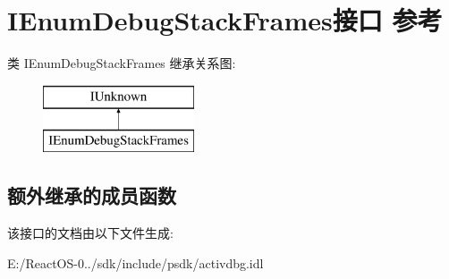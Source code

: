 \hypertarget{interface_i_enum_debug_stack_frames}{}\section{I\+Enum\+Debug\+Stack\+Frames接口 参考}
\label{interface_i_enum_debug_stack_frames}
类 I\+Enum\+Debug\+Stack\+Frames 继承关系图\+:\begin{figure}[H]
\begin{center}
\leavevmode
\includegraphics[height=2.000000cm]{interface_i_enum_debug_stack_frames}
\end{center}
\end{figure}
\subsection*{额外继承的成员函数}


该接口的文档由以下文件生成\+:\begin{DoxyCompactItemize}
\item 
E\+:/\+React\+O\+S-\/0../sdk/include/psdk/activdbg.\+idl\end{DoxyCompactItemize}
